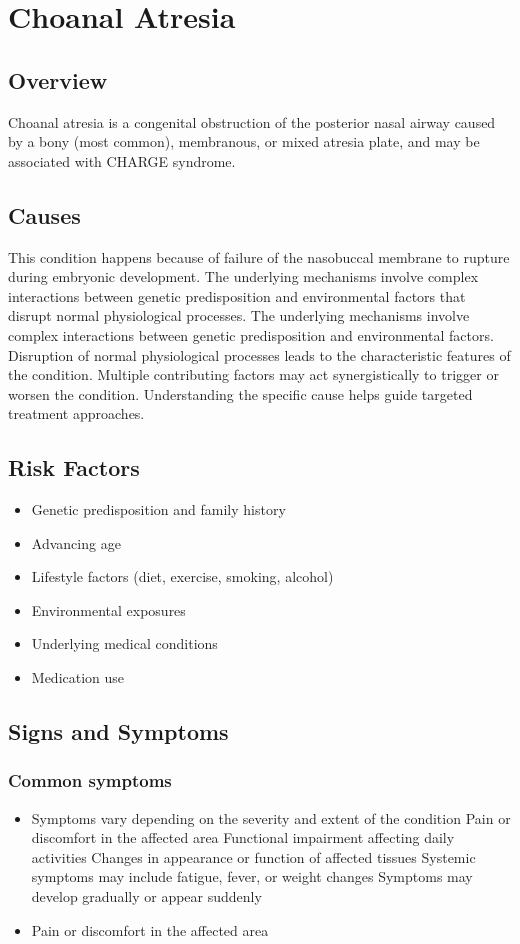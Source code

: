 \chapter{Choanal Atresia}
\label{sec:Choanal Atresia}

\section{Overview}
Choanal atresia is a congenital obstruction of the posterior nasal airway caused by a bony (most common), membranous, or mixed atresia plate, and may be associated with CHARGE syndrome.
\section{Causes}
This condition happens because of failure of the nasobuccal membrane to rupture during embryonic development. The underlying mechanisms involve complex interactions between genetic predisposition and environmental factors that disrupt normal physiological processes. The underlying mechanisms involve complex interactions between genetic predisposition and environmental factors. Disruption of normal physiological processes leads to the characteristic features of the condition. Multiple contributing factors may act synergistically to trigger or worsen the condition. Understanding the specific cause helps guide targeted treatment approaches.
\section{Risk Factors}


\begin{itemize}[noitemsep]
  \item Genetic predisposition and family history
  \item Advancing age
  \item Lifestyle factors (diet, exercise, smoking, alcohol)
  \item Environmental exposures
  \item Underlying medical conditions
  \item Medication use
\end{itemize}
\section{Signs and Symptoms}

\subsection{Common symptoms}
\begin{itemize}[noitemsep]
  \item Symptoms vary depending on the severity and extent of the condition Pain or discomfort in the affected area Functional impairment affecting daily activities Changes in appearance or function of affected tissues Systemic symptoms may include fatigue, fever, or weight changes Symptoms may develop gradually or appear suddenly
  \item Pain or discomfort in the affected area
  \end{itemize}


